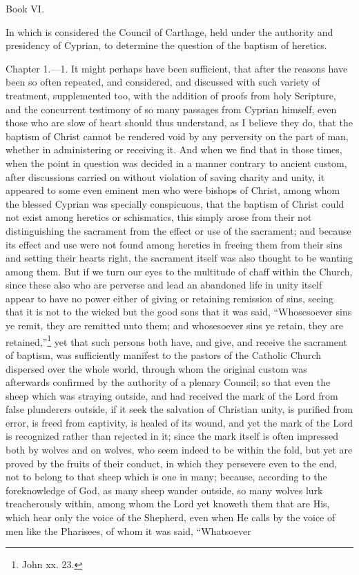 
Book VI.

In which is considered the Council of Carthage, held under the authority and presidency of Cyprian, to determine the question of the baptism of heretics.


Chapter 1.—1. It might perhaps have been sufficient, that after the reasons have been so often repeated, and considered, and discussed with such variety of treatment, supplemented too, with the addition of proofs from holy Scripture, and the concurrent testimony of so many passages from Cyprian himself, even those who are slow of heart should thus understand, as I believe they do, that the baptism of Christ cannot be rendered void by any perversity on the part of man, whether in administering or receiving it. And when we find that in those times, when the point in question was decided in a manner contrary to ancient custom, after discussions carried on without violation of saving charity and unity, it appeared to some even eminent men who were bishops of Christ, among whom the blessed Cyprian was specially conspicuous, that the baptism of Christ could not exist among heretics or schismatics, this simply arose from their not distinguishing the sacrament from the effect or use of the sacrament; and because its effect and use were not found among heretics in freeing them from their sins and setting their hearts right, the sacrament itself was also thought to be wanting among them. But if we turn our eyes to the multitude of chaff within the Church, since these also who are perverse and lead an abandoned life in unity itself appear to have no power either of giving or retaining remission of sins, seeing that it is not to the wicked but the good sons that it was said, ``Whosesoever sins ye remit, they are remitted unto them; and whosesoever sins ye retain, they are retained,''\footnote{\par  John xx. 23.} yet that such persons both have, and give, and receive the sacrament of baptism, was sufficiently manifest to the pastors of the Catholic Church dispersed over the whole world, through whom the original custom was afterwards confirmed by the authority of a plenary Council; so that even the sheep which was straying outside, and had received the mark of the Lord from false plunderers outside, if it seek the salvation of Christian unity, is purified from error, is freed from captivity, is healed of its wound, and yet the mark of the Lord is recognized rather than rejected in it; since the mark itself is often impressed both by wolves and on wolves, who seem indeed to be within the fold, but yet are proved by the fruits of their conduct, in which they persevere even to the end, not to belong to that sheep which is one in many; because, according to the foreknowledge of God, as many sheep wander outside, so many wolves lurk treacherously within, among whom the Lord yet knoweth them that are His, which hear only the voice of the Shepherd, even when He calls by the voice of men like the Pharisees, of whom it was said, ``Whatsoever 